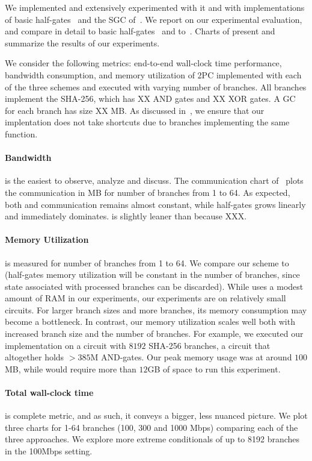 We implemented \ourschemelong and extensively experimented with it and with implementations of basic half-gates~\cite{EC:ZahRosEva15} and the \stack SGC of~\HK.
We report on our experimental evaluation, and compare in detail to  basic half-gates~\cite{EC:ZahRosEva15} and to~\HK.  Charts of  present and summarize the results of our experiments.

We consider  the following metrics: end-to-end wall-clock time performance, bandwidth consumption, and memory utilization of 2PC implemented with each of the three schemes and executed with varying number of branches.  All branches implement the SHA-256, which has XX AND gates and XX XOR gates.  A GC for each branch has size XX MB.  As discussed in~, we ensure that our implentation does not take shortcuts due to branches implementing the same function.

\paragraph{Bandwidth}  is the easiest to observe, analyze and discuss.  The communication chart of~ plots the communication in MB for number of branches from 1 to 64.  As expected, both \stack and \ourschemelong communication remains almost constant, while half-gates grows linearly and immediately dominates.  \ourschemelong is slightly leaner than \stack because XXX.

\paragraph{Memory Utilization} is measured for number of branches from 1 to 64.  We compare our scheme to \stack (half-gates memory utilization will be constant in the number of branches, since state associated with processed branches can be discarded).  While \stack uses a modest amount of RAM in our experiments, our experiments are on relatively small circuits.  For larger branch sizes and more branches, its memory consumption may become a bottleneck.  In contrast, our memory utilization scales well both with increased branch size and the number of branches.  For example, we executed our implementation on a circuit with $8192$
SHA-256 branches, a circuit that altogether holds $> 385$M AND-gates.
Our peak memory usage was at around $100$MB, while \HK would require more
than $12$GB of space to run this experiment.

\paragraph{Total wall-clock time} is complete metric, and as such, it conveys a bigger, less nuanced picture.  We plot three charts for 1-64 branches (100, 300 and 1000 Mbps) comparing each of the three approaches.  We explore more extreme conditionals of up to 8192 branches in the 100Mbps setting.


